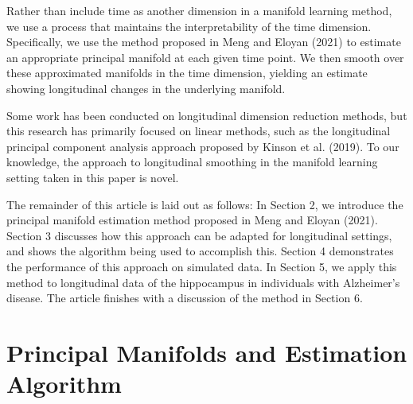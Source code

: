\documentclass[11pt,reqno]{article}
\begin{document}
Rather than include time as another dimension in a manifold learning method, we use a process that maintains the interpretability of the time dimension. Specifically, we use the method proposed in Meng and Eloyan (2021) to estimate an appropriate principal manifold at each given time point. We then smooth over these approximated manifolds in the time dimension, yielding an estimate showing longitudinal changes in the underlying manifold.

Some work has been conducted on longitudinal dimension reduction methods, but this research has primarily focused on linear methods, such as the longitudinal principal component analysis approach proposed by Kinson et al. (2019). To our knowledge, the approach to longitudinal smoothing in the manifold learning setting taken in this paper is novel.

The remainder of this article is laid out as follows: In Section 2, we introduce the principal manifold estimation method proposed in Meng and Eloyan (2021). Section 3 discusses how this approach can be adapted for longitudinal settings, and shows the algorithm being used to accomplish this. Section 4 demonstrates the performance of this approach on simulated data. In Section 5, we apply this method to longitudinal data of the hippocampus in individuals with Alzheimer's disease. The article finishes with a discussion of the method in Section 6.

\section{Principal Manifolds and Estimation Algorithm}
\end{document}
